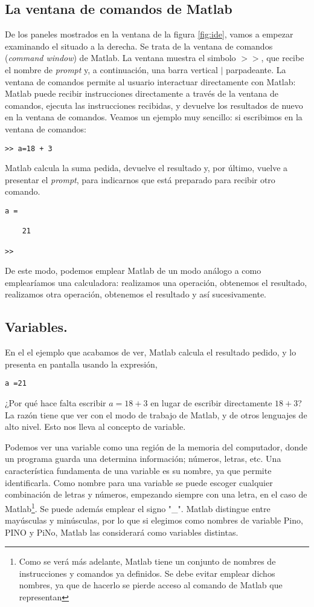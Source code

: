 \subsection{La ventana de comandos de Matlab} 
De los paneles mostrados en la ventana de la figura \ref{fig:ide}, vamos a empezar examinando el situado a la derecha. Se trata de la ventana de comandos (\emph{command window}) de Matlab.   La ventana muestra el simbolo $>>$, que recibe el nombre de \emph{prompt} y, a continuación, una barra vertical $|$ parpadeante.  La ventana de comandos permite al usuario interactuar directamente con Matlab: Matlab puede recibir instrucciones directamente a través de la ventana de comandos, ejecuta las instrucciones recibidas, y devuelve los resultados de nuevo en la ventana de comandos. Veamos un ejemplo muy sencillo: si escribimos en la ventana de comandos:

\begin{verbatim}
>> a=18 + 3
\end{verbatim}

Matlab calcula la suma pedida, devuelve el resultado y, por último, vuelve a presentar el \emph{prompt}, para indicarnos que está preparado para recibir otro comando.

\begin{verbatim}
a =

    21

>> 
\end{verbatim}

De este modo, podemos emplear Matlab de un modo análogo a como emplearíamos una calculadora: realizamos una operación, obtenemos el resultado, realizamos otra operación, obtenemos el resultado  y así sucesivamente.
\subsection{Variables.} 
En el el ejemplo que acabamos de ver, Matlab calcula el resultado pedido, y lo presenta en pantalla usando la expresión, \begin{verbatim}
a =21
\end{verbatim} ¿Por qué hace falta escribir $a=18+3$ en lugar de escribir directamente $18+3$? La razón tiene que ver con el modo de trabajo de Matlab, y de otros lenguajes de alto nivel. Esto nos lleva al concepto de variable. 

Podemos ver una variable como una región de la memoria del computador, donde un programa guarda una determina información; números, letras, etc. Una característica fundamenta de una variable es su nombre, ya que permite identificarla.  Como nombre para una variable se puede escoger cualquier combinación de letras y números, empezando siempre con una letra, en el caso de Matlab\footnote{Como se verá más adelante, Matlab tiene un conjunto de nombres de instrucciones y comandos ya definidos. Se debe evitar emplear dichos nombres, ya que de hacerlo se pierde acceso al comando de Matlab que representan}. Se puede además emplear el signo "\_". Matlab distingue entre mayúsculas y minúsculas, por lo que si elegimos como nombres de variable Pino, PINO y PiNo, Matlab las considerará como variables distintas. 

